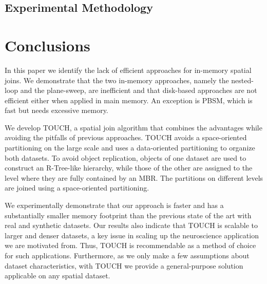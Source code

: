 \documentclass{vldb}
\begin{document}
\subsection{Experimental Methodology}
\label{experimentalmethodology}

\section{Conclusions}
\label{s_conclusions}
In this paper we identify the lack of efficient approaches for in-memory spatial joins. We demonstrate that the two in-memory approaches, namely the nested-loop
and the plane-sweep, are inefficient and that disk-based approaches are not efficient either when applied in main memory. An exception is PBSM, which is fast
but needs excessive memory.

We develop TOUCH, a spatial join algorithm that combines the advantages while avoiding the pitfalls of previous approaches. TOUCH avoids a space-oriented
partitioning on the large scale and uses a data-oriented partitioning to organize both datasets. To avoid object replication, objects of one dataset are used
to construct an R-Tree-like hierarchy, while those of the other are assigned to the level where they are fully contained by an MBR. The partitions on
different levels are joined using a space-oriented partitioning.

We experimentally demonstrate that our approach is faster and has a substantially smaller memory footprint than the previous state of the art with real and
synthetic datasets. Our results also indicate that TOUCH is scalable to larger and denser datasets, a key issue in scaling up the neuroscience application we
are motivated from. Thus, TOUCH is recommendable as a method of choice for such applications. Furthermore, as we only make a few assumptions about dataset
characteristics, with TOUCH we provide a general-purpose solution applicable on any spatial dataset.

\balance



%
%
\end{document}
